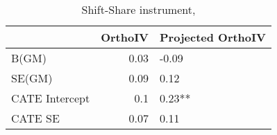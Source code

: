 \begin{table}\centering\caption{Shift-Share instrument, }\begin{tabular}{lrl}
\toprule
                &   OrthoIV & Projected OrthoIV   \\
\midrule
 B(GM)          &      0.03 & -0.09               \\
 SE(GM)         &      0.09 & 0.12                \\
 CATE Intercept &      0.1  & 0.23**              \\
 CATE SE        &      0.07 & 0.11                \\
\bottomrule
\end{tabular}\end{table}